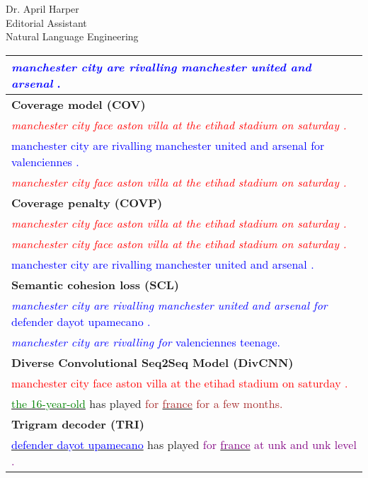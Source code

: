 \documentclass[11pt]{letter} %
\theoremstyle{definition}
\begin{document}
\begin{letter}{Dr. April Harper \\
            Editorial Assistant \\
			Natural Language Engineering}
\begin{enumerate}
\begin{itemize}
\begin{center}
\begin{tabular}{|p{14.3cm}|}
                		\textcolor{blue}{\textit{manchester city are rivalling manchester united and arsenal }. }\\
                		\hline \bf Coverage model (COV) \\
                		\hline \textcolor{red}{\textit{manchester city face aston villa at the etihad stadium on saturday .}} \\
                		\textcolor{blue}{manchester city are rivalling manchester united and arsenal for valenciennes .}\\
                		\textcolor{red}{\textit{manchester city face aston villa at the etihad stadium on saturday .}} \\
                		\hline \bf Coverage penalty (COVP)\\
                		\hline \textcolor{red}{\textit{manchester city face aston villa at the etihad stadium on saturday .}} \\
                		\textcolor{red}{\textit{manchester city face aston villa at the etihad stadium on saturday .}} \\
                		\textcolor{blue}{manchester city are rivalling manchester united and arsenal .}\\
                		\hline \bf Semantic cohesion loss (SCL) \\
                		\hline \textcolor{blue}{\textit{manchester city are rivalling manchester united and arsenal for} defender dayot upamecano .}\\
                		\textcolor{blue}{\textit{manchester city are rivalling for} valenciennes teenage.} \\
                		\hline \bf Diverse Convolutional Seq2Seq  Model (DivCNN) \\
                		\hline \textcolor{red}{manchester city face aston villa at the etihad stadium on saturday . } \\
                		\underline{\textcolor{green}{the 16-year-old}} has played \textcolor{brown}{for} \underline{\textcolor{brown}{france}}  \textcolor{brown}{for a few months.}
                		\vspace{0.2mm} \\
                		\hline \bf Trigram decoder (TRI) \\
                		\hline \underline{\textcolor{blue}{defender dayot upamecano}} has played \textcolor{purple}{for} \underline{\textcolor{purple}{france}} \textcolor{purple}{at unk and unk level .}\\ 

\end{tabular}
\end{center}
\end{itemize}
\end{enumerate}
\end{letter}
\end{document}
